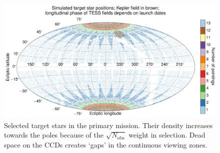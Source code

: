\begin{figure}[!th] %
	\centering
	\includegraphics{figures/positions_pointings_kepler.pdf}
	\caption{Selected target stars in the primary mission. Their density increases towards the poles because of the $\sqrt{N_\text{obs}}$ weight in selection. Dead space on the CCDs creates `gaps' in the continuous viewing zones.}
	\label{fig:positions_pointings}
\end{figure}
